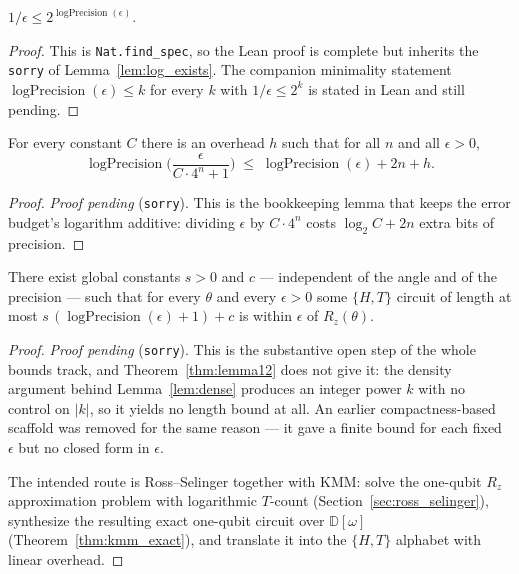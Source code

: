 \begin{lemma}
  \label{lem:log_precision_spec}
  \leanok
  $1/\epsilon \le 2^{\operatorname{logPrecision}(\epsilon)}$.
\end{lemma}

\begin{proof}
  This is \texttt{Nat.find\_spec}, so the Lean proof is complete but inherits
  the \texttt{sorry} of Lemma~\ref{lem:log_exists}.  The companion minimality
  statement $\operatorname{logPrecision}(\epsilon) \le k$ for every $k$ with
  $1/\epsilon \le 2^k$ is stated in Lean and still pending.
\end{proof}

\begin{lemma}
  \label{lem:log_overhead}
  \leanok
  For every constant $C$ there is an overhead $h$ such that for all $n$ and all
  $\epsilon > 0$,
  \[
    \operatorname{logPrecision}\!\Big(\frac{\epsilon}{C\cdot 4^{n} + 1}\Big)
      \;\le\; \operatorname{logPrecision}(\epsilon) + 2n + h .
  \]
\end{lemma}

\begin{proof}
  \emph{Proof pending} (\texttt{sorry}).  This is the bookkeeping lemma that
  keeps the error budget's logarithm additive: dividing $\epsilon$ by
  $C\cdot4^n$ costs $\log_2 C + 2n$ extra bits of precision.
\end{proof}

\begin{lemma}
  \label{lem:lemma12_constants}
  \leanok
  There exist global constants $s > 0$ and $c$ --- independent of the angle and
  of the precision --- such that for every $\theta$ and every $\epsilon > 0$
  some $\{H,T\}$ circuit of length at most
  $s\,(\operatorname{logPrecision}(\epsilon)+1) + c$ is within $\epsilon$ of
  $R_z(\theta)$.
\end{lemma}

\begin{proof}
  \emph{Proof pending} (\texttt{sorry}).  This is the substantive open step of
  the whole bounds track, and Theorem~\ref{thm:lemma12} does not give it:
  the density argument behind Lemma~\ref{lem:dense} produces an integer power
  $k$ with no control on $\lvert k\rvert$, so it yields no length bound at all.
  An earlier compactness-based scaffold was removed for the same reason --- it
  gave a finite bound for each fixed $\epsilon$ but no closed form in
  $\epsilon$.

  The intended route is Ross--Selinger together with KMM: solve the one-qubit
  $R_z$ approximation problem with logarithmic $T$-count
  (Section~\ref{sec:ross_selinger}), synthesize the resulting exact one-qubit
  circuit over $\mathbb{D}[\omega]$ (Theorem~\ref{thm:kmm_exact}), and translate
  it into the $\{H,T\}$ alphabet with linear overhead.
\end{proof}

